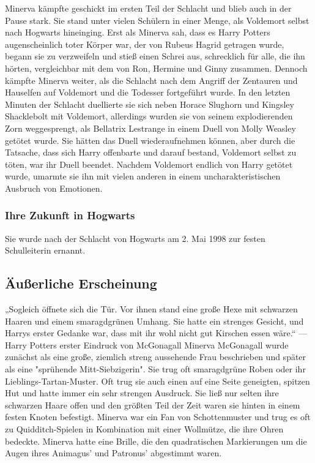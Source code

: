 \documentclass[a4paper, 10pt]{article}
\begin{document}
\newline
{}  
Minerva kämpfte geschickt im ersten Teil der Schlacht und blieb auch in der Pause stark. Sie stand unter vielen Schülern in einer Menge, als Voldemort selbst nach Hogwarts hineinging. Erst als Minerva sah, dass es Harry Potters augenscheinlich toter Körper war, der von Rubeus Hagrid getragen wurde, begann sie zu verzweifeln und stieß einen Schrei aus, schrecklich für alle, die ihn hörten, vergleichbar mit dem von Ron, Hermine und Ginny zusammen.
\vspace{10pt}
\newline
{}  
Dennoch kämpfte Minerva weiter, als die Schlacht nach dem Angriff der Zentauren und Hauselfen auf Voldemort und die Todesser fortgeführt wurde. In den letzten Minuten der Schlacht duellierte sie sich neben Horace Slughorn und Kingsley Shacklebolt mit Voldemort, allerdings wurden sie von seinem explodierenden Zorn weggesprengt, als Bellatrix Lestrange in einem Duell von Molly Weasley getötet wurde.
\vspace{10pt}
\newline
{}  
Sie hätten das Duell wiederaufnehmen können, aber durch die Tatsache, dass sich Harry offenbarte und darauf bestand, Voldemort selbst zu töten, war ihr Duell beendet. Nachdem Voldemort endlich von Harry getötet wurde, umarmte sie ihn mit vielen anderen in einem uncharakteristischen Ausbruch von Emotionen.
\subsubsection*{\large Ihre Zukunft in Hogwarts}
Sie wurde nach der Schlacht von Hogwarts am 2. Mai 1998 zur festen Schulleiterin ernannt.
\subsection*{\Large Äußerliche Erscheinung}
„Sogleich öffnete sich die Tür. Vor ihnen stand eine große Hexe mit schwarzen Haaren und einem smaragdgrünen Umhang. Sie hatte ein strenges Gesicht, und Harrys erster Gedanke war, dass mit ihr wohl nicht gut Kirschen essen wäre.“
\vspace{10pt}
\newline
{}  
— Harry Potters erster Eindruck von McGonagall
\vspace{10pt}
\newline
{}  
Minerva McGonagall wurde zunächst als eine große, ziemlich streng aussehende Frau beschrieben und später als eine "sprühende Mitt-Siebzigerin". Sie trug oft smaragdgrüne Roben oder ihr Lieblings-Tartan-Muster. Oft trug sie auch einen auf eine Seite geneigten, spitzen Hut und hatte immer ein sehr strengen Ausdruck. Sie ließ nur selten ihre schwarzen Haare offen und den größten Teil der Zeit waren sie hinten in einem festen Knoten befestigt.
\vspace{10pt}
\newline
{}  
Minerva war ein Fan von Schottenmuster und trug es oft zu Quidditch-Spielen in Kombination mit einer Wollmütze, die ihre 
Ohren bedeckte. Minerva hatte eine Brille, die den quadratischen Markierungen um die Augen ihres Animagus' und Patronus' abgestimmt waren.
\end{document}
